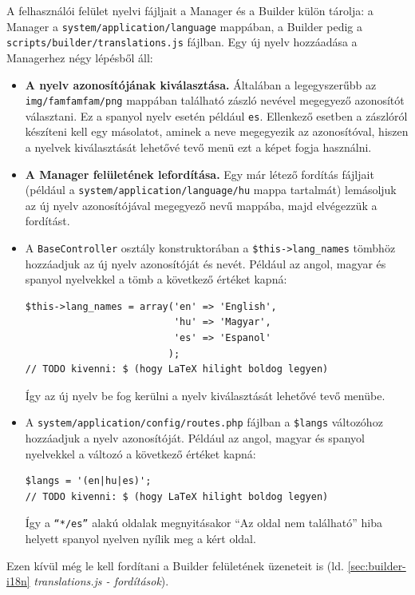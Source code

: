 \documentclass[12pt,a4paper,twoside]{article}
\begin{document}
A felhasználói felület nyelvi fájljait a Manager és a Builder külön tárolja: a
Manager a \texttt{system/application/language} mappában, a Builder pedig a
\texttt{scripts/builder/translations.js} fájlban. Egy új nyelv hozzáadása a
Managerhez négy lépésből áll:

\begin{itemize}
  \item \textbf{A nyelv azonosítójának kiválasztása.} Általában a legegyszerűbb az
    \texttt{img/famfamfam/png} mappában található zászló nevével megegyező
    azonosítót választani. Ez a spanyol nyelv esetén például
    \texttt{es}. Ellenkező esetben a zászlóról készíteni kell egy
    másolatot, aminek a neve megegyezik az azonosítóval, hiszen a nyelvek
    kiválasztását lehetővé tevő menü ezt a képet fogja használni.
  \item \textbf{A Manager felületének lefordítása.} Egy már létező fordítás fájljait
    (például a \texttt{system/application/language/hu} mappa tartalmát)
    lemásoljuk az új nyelv azonosítójával megegyező nevű mappába, majd
    elvégezzük a fordítást.
  \item A \texttt{BaseController} osztály konstruktorában a
    \texttt{\$this->lang\_names} tömbhöz hozzáadjuk az új nyelv azonosítóját és
    nevét. Például az angol, magyar és spanyol nyelvekkel a tömb a következő
    értéket kapná:
    \begin{lstlisting}[firstnumber=35]
$this->lang_names = array('en' => 'English',
                          'hu' => 'Magyar',
                          'es' => 'Espanol'
                         );
// TODO kivenni: $ (hogy LaTeX hilight boldog legyen)
    \end{lstlisting}
    Így az új nyelv be fog kerülni a nyelv kiválasztását lehetővé tevő menübe.
  \item A \texttt{system/application/config/routes.php} fájlban a
    \texttt{\$langs} változóhoz hozzáadjuk a nyelv azonosítóját. Például az
    angol, magyar és spanyol nyelvekkel a változó a következő értéket kapná:
    \begin{lstlisting}[firstnumber=46]
$langs = '(en|hu|es)';
// TODO kivenni: $ (hogy LaTeX hilight boldog legyen)
    \end{lstlisting}
    Így a \texttt{``*/es''} alakú oldalak megnyitásakor ``Az oldal nem található''
    hiba helyett spanyol nyelven nyílik meg a kért oldal.

\end{itemize}

Ezen kívül még le kell fordítani a Builder felületének üzeneteit is (ld.
\ref{sec:builder-i18n} \textit{translations.js - fordítások}).
\end{document}
